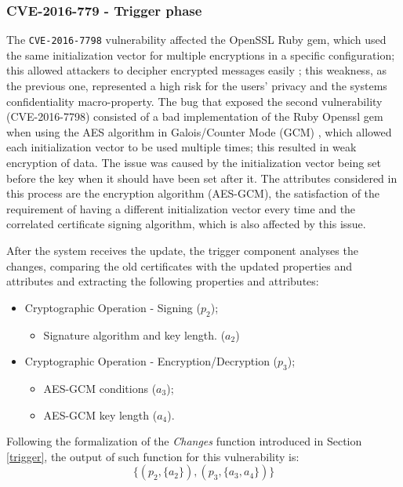 \subsubsection{CVE-2016-779 - Trigger phase}
The \texttt{CVE-2016-7798} vulnerability affected the OpenSSL Ruby gem, which used the same initialization vector for multiple encryptions in a specific configuration; this allowed attackers to decipher encrypted messages easily \cite{vector}; this weakness, as the previous one, represented a high risk for the users' privacy and the systems confidentiality macro-property.
The bug that exposed the second vulnerability (CVE-2016-7798) consisted of a bad implementation of the Ruby Openssl gem when using the AES algorithm in Galois/Counter Mode (GCM) \cite{gcm}, which allowed each initialization vector to be used multiple times; this resulted in weak encryption of data. The issue was caused by the initialization vector being set before the key when it should have been set after it. The attributes considered in this process are the encryption algorithm (AES-GCM), the satisfaction of the requirement of having a different initialization vector every time and the correlated certificate signing algorithm, which is also affected by this issue.



After the system receives the update, the trigger component analyses the changes, comparing the old certificates with the updated properties and attributes and extracting the following properties and attributes:

\begin{itemize}
    \item Cryptographic Operation - Signing (\(p_2\));
    \begin{itemize}
        \item Signature algorithm and key length. (\(a_2\))
    \end{itemize}
    \item Cryptographic Operation - Encryption/Decryption (\(p_3\));
    \begin{itemize}
        \item AES-GCM conditions (\(a_3\));
        \item AES-GCM key length (\(a_4\)).
    \end{itemize}
\end{itemize}

Following the formalization of the \textit{Changes} function introduced in Section \ref{trigger}, the output of such function for this vulnerability is: \[ \{(p_2, \{a_2\}), (p_3, \{a_3, a_4\}) \}\]

